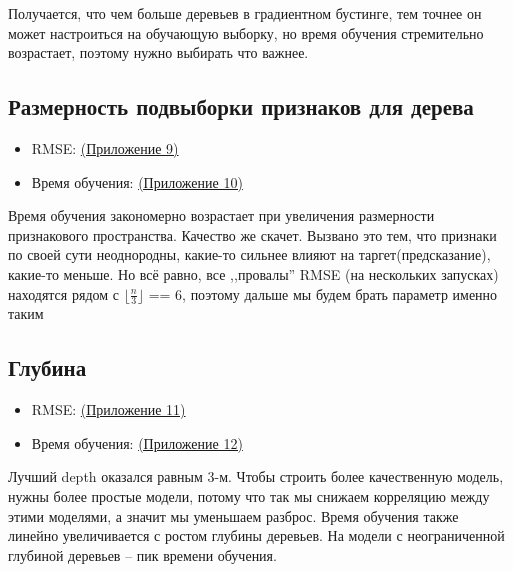 \documentclass[12pt]{report}
\begin{document}
Получается, что чем больше деревьев в градиентном бустинге, тем точнее он может настроиться
на обучающую выборку, но время обучения стремительно возрастает, поэтому нужно выбирать что важнее.


\subsection{Размерность подвыборки признаков для дерева}
\begin{itemize}
    \item RMSE: \hyperref[fig::app9]{(Приложение 9)}
    \item Время обучения: \hyperref[fig::app10]{(Приложение 10)}
\end{itemize}
Время обучения закономерно возрастает при увеличения размерности признакового пространства.
Качество же скачет. Вызвано это тем, что признаки по своей сути неоднородны, какие-то
сильнее влияют на таргет(предсказание), какие-то меньше. Но всё равно, все ,,провалы'' 
RMSE (на нескольких запусках) находятся рядом с $\lfloor \frac{n}{3}\rfloor$ == 6, 
поэтому дальше мы будем брать параметр именно таким


\subsection{Глубина}
\begin{itemize}
    \item RMSE: \hyperref[fig::app11]{(Приложение 11)}
    \item Время обучения: \hyperref[fig::app12]{(Приложение 12)}
\end{itemize}
Лучший depth оказался равным 3-м. Чтобы строить более качественную модель, 
нужны более простые модели, потому что так мы снижаем корреляцию между 
этими моделями, а значит мы уменьшаем разброс.
Время обучения также линейно увеличивается с ростом глубины деревьев.
На модели с неограниченной глубиной деревьев -- пик времени обучения. 
\end{document}
